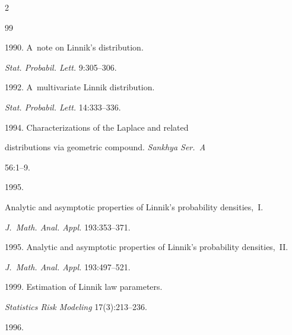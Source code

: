 \begin{multicols}{2}
{{\begin{thebibliography}{99}


 1990. A~note on Linnik's distribution. 


\textit{Stat. Probabil. Lett.} 9:305--306.







 1992. A~multivariate Linnik distribution.


\textit{Stat. Probabil. Lett.} 14:333--336.







 1994. Characterizations of the Laplace and related


distributions via geometric compound. \textit{Sankhya Ser.~A}


 56:1--9.










 1995. 


Analytic and asymptotic properties of Linnik's probability densities,~I. 


\textit{J.~Math. Anal. Appl.} 193:353--371.









 1995. Analytic and asymptotic properties of Linnik's probability densities,~II. 


 \textit{J.~Math. Anal. Appl.} 193:497--521.












1999. Estimation of Linnik law parameters. 


\textit{Statistics Risk Modeling} 17(3):213--236.







 1996. 



\end{thebibliography}}}
\end{multicols}
